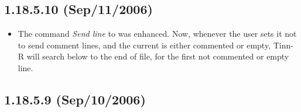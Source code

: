 \subsection{1.18.5.10 (Sep/11/2006)}

\begin{itemize}
  \item The command \textit{Send line} to \RR{} was enhanced. Now, whenever
    the user sets it not to send comment lines, and the current is either
    commented or empty, Tinn-R will search below to the end of file, for
    the first not commented or empty line.
\end{itemize}


\subsection{1.18.5.9 (Sep/10/2006)}

